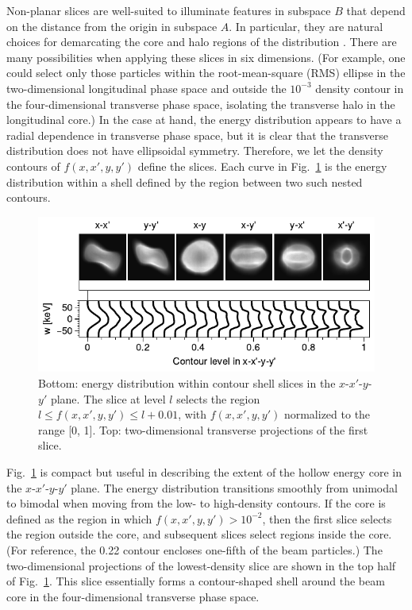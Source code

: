 \documentclass[%
 reprint,
nofootinbib,
 amsmath,amssymb,
 aps,
prstab,
]{revtex4-2}
\begin{document}
Non-planar slices are well-suited to illuminate features in subspace $B$ that depend on the distance from the origin in subspace $A$. In particular, they are natural choices for demarcating the core and halo regions of the distribution \cite{Aleksandrov2016-IPAC}. There are many possibilities when applying these slices in six dimensions. (For example, one could select only those particles within the root-mean-square (RMS) ellipse in the two-dimensional longitudinal phase space and outside the $10^{-3}$ density contour in the four-dimensional transverse phase space, isolating the transverse halo in the longitudinal core.) In the case at hand, the energy distribution appears to have a radial dependence in transverse phase space, but it is clear that the transverse distribution does not have ellipsoidal symmetry. Therefore, we let the density contours of $f(x, x', y, y')$ define the slices. Each curve in Fig.~\ref{fig:hollow_energy_b} is the energy distribution within a shell defined by the region between two such nested contours.
%
\begin{figure}[]
    \centering
    \includegraphics[width=\columnwidth]{fig_shell_slice.pdf}
    \caption{Bottom: energy distribution within contour shell slices in the $x$-$x'$-$y$-$y'$ plane. The slice at level $l$ selects the region $l \le f(x, x', y, y') \le l + 0.01$, with $f(x, x', y, y')$ normalized to the range [0, 1]. Top: two-dimensional transverse projections of the first slice.}
    \label{fig:hollow_energy_b}
\end{figure}
%

Fig.~\ref{fig:hollow_energy_b} is compact but useful in describing the extent of the hollow energy core in the $x$-$x'$-$y$-$y'$ plane. The energy distribution transitions smoothly from unimodal to bimodal when moving from the low- to high-density contours. If the core is defined as the region in which $f(x, x', y, y') > 10^{-2}$, then the first slice selects the region outside the core, and subsequent slices select regions inside the core. (For reference, the 0.22 contour encloses one-fifth of the beam particles.) The two-dimensional projections of the lowest-density slice are shown in the top half of Fig.~\ref{fig:hollow_energy_b}. This slice essentially forms a contour-shaped shell around the beam core in the four-dimensional transverse phase space.
\end{document}
